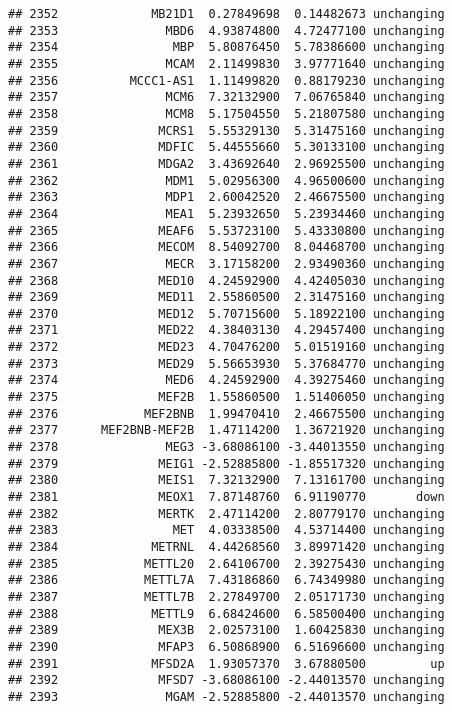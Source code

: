 \documentclass[]{article}
\begin{document}
\begin{verbatim}
## 2352             MB21D1  0.27849698  0.14482673 unchanging
## 2353               MBD6  4.93874800  4.72477100 unchanging
## 2354                MBP  5.80876450  5.78386600 unchanging
## 2355               MCAM  2.11499830  3.97771640 unchanging
## 2356          MCCC1-AS1  1.11499820  0.88179230 unchanging
## 2357               MCM6  7.32132900  7.06765840 unchanging
## 2358               MCM8  5.17504550  5.21807580 unchanging
## 2359              MCRS1  5.55329130  5.31475160 unchanging
## 2360              MDFIC  5.44555660  5.30133100 unchanging
## 2361              MDGA2  3.43692640  2.96925500 unchanging
## 2362               MDM1  5.02956300  4.96500600 unchanging
## 2363               MDP1  2.60042520  2.46675500 unchanging
## 2364               MEA1  5.23932650  5.23934460 unchanging
## 2365              MEAF6  5.53723100  5.43330800 unchanging
## 2366              MECOM  8.54092700  8.04468700 unchanging
## 2367               MECR  3.17158200  2.93490360 unchanging
## 2368              MED10  4.24592900  4.42405030 unchanging
## 2369              MED11  2.55860500  2.31475160 unchanging
## 2370              MED12  5.70715600  5.18922100 unchanging
## 2371              MED22  4.38403130  4.29457400 unchanging
## 2372              MED23  4.70476200  5.01519160 unchanging
## 2373              MED29  5.56653930  5.37684770 unchanging
## 2374               MED6  4.24592900  4.39275460 unchanging
## 2375              MEF2B  1.55860500  1.51406050 unchanging
## 2376            MEF2BNB  1.99470410  2.46675500 unchanging
## 2377      MEF2BNB-MEF2B  1.47114200  1.36721920 unchanging
## 2378               MEG3 -3.68086100 -3.44013550 unchanging
## 2379              MEIG1 -2.52885800 -1.85517320 unchanging
## 2380              MEIS1  7.32132900  7.13161700 unchanging
## 2381              MEOX1  7.87148760  6.91190770       down
## 2382              MERTK  2.47114200  2.80779170 unchanging
## 2383                MET  4.03338500  4.53714400 unchanging
## 2384             METRNL  4.44268560  3.89971420 unchanging
## 2385            METTL20  2.64106700  2.39275430 unchanging
## 2386            METTL7A  7.43186860  6.74349980 unchanging
## 2387            METTL7B  2.27849700  2.05171730 unchanging
## 2388             METTL9  6.68424600  6.58500400 unchanging
## 2389              MEX3B  2.02573100  1.60425830 unchanging
## 2390              MFAP3  6.50868900  6.51696600 unchanging
## 2391             MFSD2A  1.93057370  3.67880500         up
## 2392              MFSD7 -3.68086100 -2.44013570 unchanging
## 2393               MGAM -2.52885800 -2.44013570 unchanging

\end{verbatim}
\end{document}
